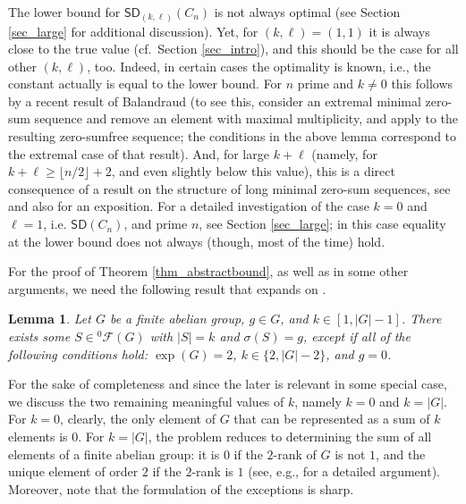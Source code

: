 \documentclass{amsart}
\newtheorem{lem}[thm]{Lemma}
\theoremstyle{definition}
\numberwithin{equation}{section}
\begin{document}
The lower bound for ${\mathsf{SD}}_{(k,\ell)}(C_n)$ is not always optimal (see Section \ref{sec_large} for additional discussion). Yet, for $(k,\ell)=(1,1)$ it is always close to the true value (cf.~Section \ref{sec_intro}), and this should be the case for all other  $(k,\ell)$, too.
Indeed, in certain cases the optimality is known, i.e., the constant actually
is equal to the lower bound. For $n$ prime and $k\neq 0$ this follows by a recent result of Balandraud \cite{eric} (to see this,
consider an extremal minimal zero-sum sequence and remove an element with maximal multiplicity, and apply \cite[Theorem 8]{eric} to the resulting zero-sumfree sequence; the conditions in the above lemma correspond to the extremal case of
that result). And, for large $k+\ell$ (namely, for $k+\ell \ge \lfloor n/2  \rfloor +2$, and even slightly below this value), this is
a direct consequence of a result on the structure of long minimal zero-sum sequences, see \cite{chen,yuan} and also \cite[Section 5.1]{barcelona} for an exposition.
For a detailed investigation of the case $k=0$ and $\ell=1$, i.e. ${\mathsf{SD}}(C_n)$, and prime $n$,  see Section \ref{sec_large}; in this case equality at the lower bound does not always (though, most of the time) hold.

For the proof of Theorem \ref{thm_abstractbound},
as well as in some other arguments,
we need the following result that expands on \cite[Lemma 7.1]{GaoGe}.

\begin{lem}
\label{lr_lem_sum}
Let $G$ be a finite abelian group, $g \in G$, and $k \in [1,|G|-1]$.
There exists some $S \in {{}^{{0}}\!\mathcal{F}}(G)$ with $|S|=k$ and $\sigma(S)=g$,
except if all of the following conditions hold: $\exp(G)=2$, $k\in \{2, |G|-2\}$, and $g=0$.
\end{lem}
For the sake of completeness and since the later is relevant in some special case, we discuss the two remaining meaningful values of $k$, namely $k=0$ and $k=|G|$.
For $k=0$, clearly, the only element of $G$ that can be represented as a sum of $k$ elements is $0$. For $k=|G|$, the problem reduces to determining the sum of all elements of a finite abelian group: it is $0$ if the $2$-rank of $G$ is
not $1$, and the unique element of order $2$ if the $2$-rank is $1$ (see, e.g., \cite{GaoGe} for a detailed argument).
Moreover, note that the formulation of the exceptions is sharp.
\end{document}
